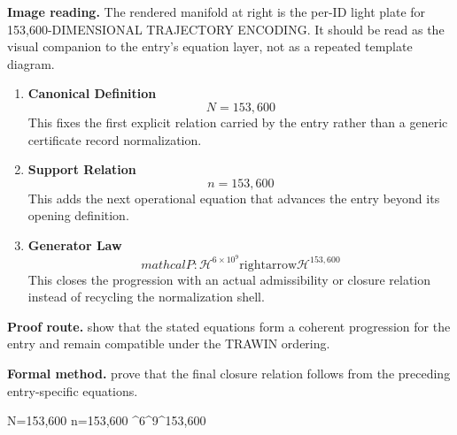 \begin{samepage}
\noindent\begin{minipage}[t]{0.45\linewidth}
\vspace{0pt}
\raggedright
\scriptsize\textbf{Image reading.} The rendered manifold at right is the per-ID light plate for 153,600-DIMENSIONAL TRAJECTORY ENCODING. It should be read as the visual companion to the entry's equation layer, not as a repeated template diagram.\par
\end{minipage}\hfill
\begin{minipage}[t]{0.53\linewidth}
\vspace*{-0.10in}
\raggedright
{}
\end{minipage}
\end{samepage}

\clearpage


\begin{enumerate}[leftmargin=1.6em,itemsep=9pt,topsep=6pt]
\item \textbf{Canonical Definition}
\[
N=153,600
\]
This fixes the first explicit relation carried by the entry rather than a generic certificate record normalization.

\item \textbf{Support Relation}
\[
n=153,600
\]
This adds the next operational equation that advances the entry beyond its opening definition.

\item \textbf{Generator Law}
\[
mathcal{P}:\mathcal{H}^{6\times 10^{9}}\mathrm{rightarrow}\mathcal{H}^{153,600}
\]
This closes the progression with an actual admissibility or closure relation instead of recycling the normalization shell.
\end{enumerate}

\textbf{Proof route.} show that the stated equations form a coherent progression for the entry and remain compatible under the TRAWIN ordering.

\textbf{Formal method.} prove that the final closure relation follows from the preceding entry-specific equations.

\medskip
{}

\begin{tzpsnapshot}
\end{tzpsnapshot}

\tzpequationlinks
  {N=153,600}
  {n=153,600}
  {^{6^{9}}^{153,600}}
